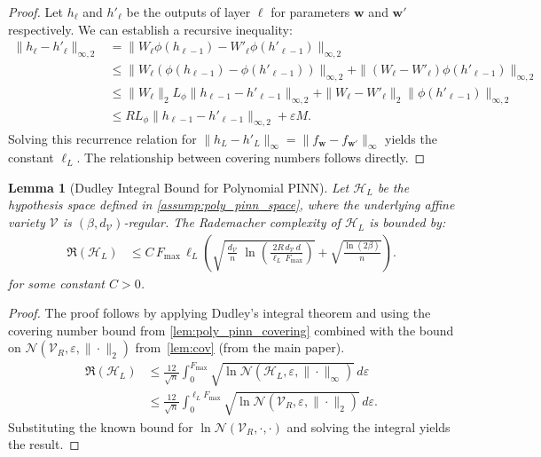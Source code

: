 \documentclass{article}
\theoremstyle{plain}
\newtheorem{lemma}[theorem]{Lemma}
\theoremstyle{definition}
\theoremstyle{remark}
\begin{document}
\begin{proof}
Let $h_\ell$ and $h'_\ell$ be the outputs of layer $\ell$ for parameters $\bm{w}$ and $\bm{w}'$ respectively. We can establish a recursive inequality:
\begin{align*}
    \|h_\ell - h'_\ell\|_{\infty, 2} &= \|W_\ell \phi(h_{\ell-1}) - W'_\ell \phi(h'_{\ell-1})\|_{\infty, 2} \\
    &\le \|W_\ell(\phi(h_{\ell-1}) - \phi(h'_{\ell-1}))\|_{\infty, 2} + \|(W_\ell - W'_\ell)\phi(h'_{\ell-1})\|_{\infty, 2} \\
    &\le \|W_\ell\|_{2} L_{\phi} \|h_{\ell-1} - h'_{\ell-1}\|_{\infty, 2} + \|W_\ell - W'_\ell\|_{2} \|\phi(h'_{\ell-1})\|_{\infty, 2} \\
    &\le R L_{\phi} \|h_{\ell-1} - h'_{\ell-1}\|_{\infty, 2} + \varepsilon M.
\end{align*}
Solving this recurrence relation for $\|h_L - h'_L\|_{\infty} = \|f_{\bm{w}} - f_{\bm{w}'}\|_{\infty}$ yields the constant $\ell_L$. The relationship between covering numbers follows directly.
\end{proof}

\begin{lemma}[Dudley Integral Bound for Polynomial PINN]
\label{lem:poly_pinn_dudley}
Let $\mathcal{H}_L$ be the hypothesis space defined in \cref{assump:poly_pinn_space}, where the underlying affine variety $\mathcal{V}$ is $(\beta, d_{\mathcal{V}})$-regular. The Rademacher complexity of $\mathcal{H}_L$ is bounded by:
\begin{align*}
\mathfrak{R}(\mathcal{H}_L)
&\le
C\,F_{\max}\,\ell_L
\left(
\sqrt{\,\frac{d_{\mathcal{V}}}{n}\;\ln\left(\frac{2R\,d_{\mathcal{V}}\,d}{\ell_L\,F_{\max}}\right)}
+\sqrt{\frac{\ln(2\beta)}{n}}
\right).
\end{align*}
for some constant $C>0$.
\end{lemma}

\begin{proof}
The proof follows by applying Dudley's integral theorem and using the covering number bound from \cref{lem:poly_pinn_covering} combined with the bound on $\mathcal{N}(\mathcal{V}_R, \varepsilon, \|\cdot\|_{2})$ from~\cref{lem:cov} (from the main paper).
\begin{align*}
    \mathfrak{R}(\mathcal{H}_L) &\le \frac{12}{\sqrt{n}} \int_0^{F_{\mathrm{max}}} \sqrt{\ln \mathcal{N}(\mathcal{H}_L, \varepsilon, \|\cdot\|_{\infty})} \, d\varepsilon \\
    &\le \frac{12}{\sqrt{n}} \int_0^{\ell_L F_{\mathrm{max}}} \sqrt{\ln \mathcal{N}(\mathcal{V}_R, \varepsilon, \|\cdot\|_{2})} \, d\varepsilon.
\end{align*}
Substituting the known bound for $\ln\mathcal{N}(\mathcal{V}_R, \cdot, \cdot)$ and solving the integral yields the result.
\end{proof}
\end{document}
